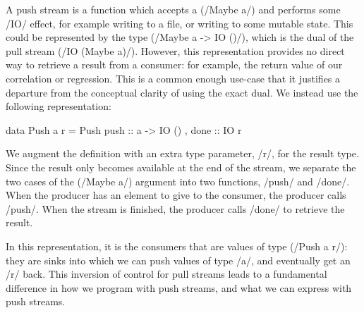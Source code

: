 A push stream is a function which accepts a (\Hs/Maybe a/) and performs some \Hs/IO/ effect, for example writing to a file, or writing to some mutable state.
This could be represented by the type (\Hs/Maybe a -> IO ()/), which is the dual of the pull stream (\Hs/IO (Maybe a)/).
However, this representation provides no direct way to retrieve a result from a consumer: for example, the return value of our correlation or regression.
This is a common enough use-case that it justifies a departure from the conceptual clarity of using the exact dual.
We instead use the following representation:

\begin{haskell}
data Push a r = Push
  { push :: a -> IO ()
  , done :: IO r }
\end{haskell}

We augment the definition with an extra type parameter, \Hs/r/, for the result type.
Since the result only becomes available at the end of the stream, we separate the two cases of the (\Hs/Maybe a/) argument into two functions, \Hs/push/ and \Hs/done/.
When the producer has an element to give to the consumer, the producer calls \Hs/push/.
When the stream is finished, the producer calls \Hs/done/ to retrieve the result.




In this representation, it is the consumers that are values of type (\Hs/Push a r/): they are sinks into which we can push values of type \Hs/a/, and eventually get an \Hs/r/ back.
This inversion of control for pull streams leads to a fundamental difference in how we program with push streams, and what we can express with push streams.

